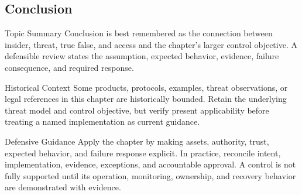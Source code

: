 \documentclass[11pt,letterpaper]{article}
\begin{document}
\subsection*{Conclusion}
\begin{CornellNotesTable}
\end{CornellNotesTable}
\begin{CornellSummaryBox}{Topic Summary}
Conclusion is best remembered as the connection between insider, threat, true false, and access and the chapter's larger control objective. A defensible review states the assumption, expected behavior, evidence, failure consequence, and required response.
\end{CornellSummaryBox}
\begin{CornellWarningBox}{Historical Context}
Some products, protocols, examples, threat observations, or legal references in this chapter are historically bounded. Retain the underlying threat model and control objective, but verify present applicability before treating a named implementation as current guidance.
\end{CornellWarningBox}
\begin{CornellOverviewBox}{Defensive Guidance}
Apply the chapter by making assets, authority, trust, expected behavior, and failure response explicit. In practice, reconcile intent, implementation, evidence, exceptions, and accountable approval. A control is not fully supported until its operation, monitoring, ownership, and recovery behavior are demonstrated with evidence.
\end{CornellOverviewBox}
\end{document}
